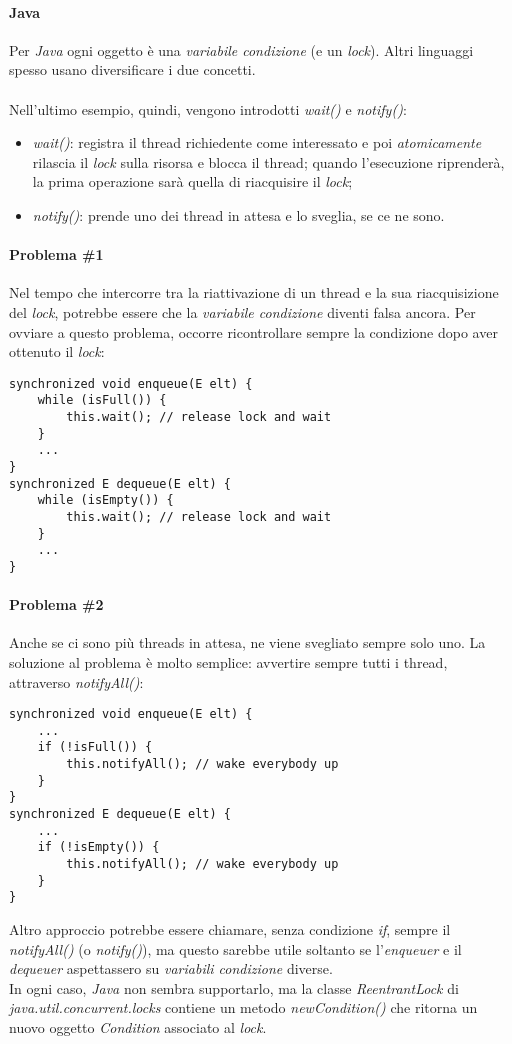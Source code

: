 \paragraph{Java}
Per \textit{Java} ogni oggetto è una \textit{variabile condizione} (e un \textit{lock}). Altri linguaggi spesso usano diversificare i due concetti. \\\\

Nell'ultimo esempio, quindi, vengono introdotti \textit{wait()} e \textit{notify()}:
\begin{itemize}
	\item \textit{wait()}: registra il thread richiedente come interessato e poi \textit{atomicamente} rilascia il \textit{lock} sulla risorsa e blocca il thread; quando l'esecuzione riprenderà, la prima operazione sarà quella di riacquisire il \textit{lock};
	\item \textit{notify()}: prende uno dei thread in attesa e lo sveglia, se ce ne sono.
\end{itemize}

\paragraph{Problema \#1}
Nel tempo che intercorre tra la riattivazione di un thread e la sua riacquisizione del \textit{lock}, potrebbe essere che la \textit{variabile condizione} diventi falsa ancora. Per ovviare a questo problema, occorre ricontrollare sempre la condizione dopo aver ottenuto il \textit{lock}:
\begin{lstlisting}
synchronized void enqueue(E elt) {
	while (isFull()) {
		this.wait(); // release lock and wait
	}
	...
}
synchronized E dequeue(E elt) {
	while (isEmpty()) {
		this.wait(); // release lock and wait
	}
	...
}
\end{lstlisting}

\paragraph{Problema \#2}
Anche se ci sono più threads in attesa, ne viene svegliato sempre solo uno. La soluzione al problema è molto semplice: avvertire sempre tutti i thread, attraverso \textit{notifyAll()}:
\begin{lstlisting}
synchronized void enqueue(E elt) {
	...
	if (!isFull()) {
		this.notifyAll(); // wake everybody up
	}
}
synchronized E dequeue(E elt) {
	...
	if (!isEmpty()) {
		this.notifyAll(); // wake everybody up
	}
}
\end{lstlisting}
Altro approccio potrebbe essere chiamare, senza condizione \textit{if}, sempre il \textit{notifyAll()} (o \textit{notify()}), ma questo sarebbe utile soltanto se l'\textit{enqueuer} e il \textit{dequeuer} aspettassero su \textit{variabili condizione} diverse. \\
In ogni caso, \textit{Java} non sembra supportarlo, ma la classe \textit{ReentrantLock} di \textit{java.util.concurrent.locks} contiene un metodo \textit{newCondition()} che ritorna un nuovo oggetto \textit{Condition} associato al \textit{lock}.